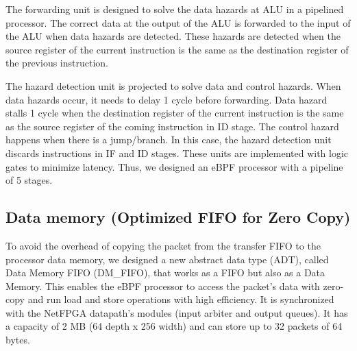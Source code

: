 The forwarding unit is designed to solve the data hazards at ALU in a pipelined processor. The correct data at the output of the ALU is forwarded to the input of the ALU when data hazards are detected. These hazards are detected when the source register of the current instruction is the same as the destination register of the previous instruction.

The hazard detection unit is projected to solve data and control hazards. When data hazards occur, it needs to delay 1 cycle before forwarding.
Data hazard stalls 1 cycle when the destination register of the current instruction is the same as the source register of the coming instruction in ID stage. The control hazard happens when there is a jump/branch. In this case, the hazard detection unit discards instructions in IF and ID stages.
These units are implemented with logic gates to minimize latency.
Thus, we designed an eBPF processor with a pipeline of 5 stages.

\subsection{Data memory (Optimized FIFO for Zero Copy)}




To avoid the overhead of copying the packet from the transfer FIFO to the processor data memory, we designed a new abstract data type (ADT), called Data Memory FIFO (DM\_FIFO), that works as a FIFO but also as a Data Memory. This enables the eBPF processor to access the packet's data with zero-copy and run load and store operations with high efficiency. It is synchronized with the NetFPGA datapath's modules (input arbiter and output queues). It has a capacity of 2 MB (64 depth x 256 width) and can store up to 32 packets of 64 bytes. 

